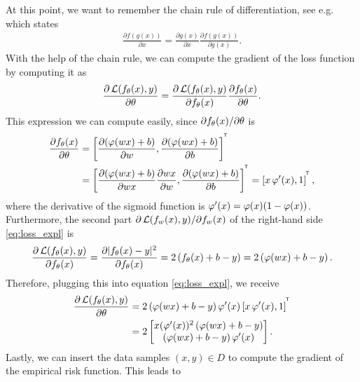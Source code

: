 \begin{example}
\begin{enumerate}
At this point, we want to remember the chain rule of differentiation, see e.g. \cite[Chapter19.6]{simmons1995calculus} which states
\begin{align}\label{eq:chain_rule}
\frac{\partial f(g(x))}{\partial x} = \frac{\partial g(x)}{\partial x} \frac{\partial f(g(x))}{\partial g(x)}.
\end{align}
With the help of the chain rule, we can compute the gradient of the loss function by computing it as
\begin{align}\label{eq:loss_expl}
\frac{\partial \operatorname{\mathcal{L}}(f_\theta(x), y)}{\partial \theta} = \frac{\partial \operatorname{\mathcal{L}}(f_\theta(x), y)}{\partial f_\theta(x)}\frac{\partial f_\theta(x)}{\partial \theta}.
\end{align}
This expression we can compute easily, since $\partial f_\theta(x)/\partial \theta$ is
\begin{align*}
\frac{\partial f_\theta(x)}{\partial \theta}
&= \left[\frac{\partial (\operatorname{\varphi}(wx) + b)}{\partial w}, \frac{\partial (\operatorname{\varphi}(wx) + b)}{\partial b} \right]^{^{\mkern-1.5mu\mathsf{T}}}\\
&= \left[\frac{\partial (\operatorname{\varphi}(wx) + b)}{\partial wx} \frac{\partial wx}{\partial w}, \frac{\partial (\operatorname{\varphi}(wx) + b)}{\partial b} \right]^{^{\mkern-1.5mu\mathsf{T}}} = \left[x\operatorname{\varphi}^{\prime}(x), 1 \right]^{^{\mkern-1.5mu\mathsf{T}}},
\end{align*}
where the derivative of the sigmoid function is $\operatorname{\varphi}^{\prime}(x) = \operatorname{\varphi}(x)(1 - \operatorname{\varphi}(x))$.\\
Furthermore, the second part $\partial \operatorname{\mathcal{L}}(f_w(x), y)/\partial f_w(x)$ of the right-hand side \eqref{eq:loss_expl} is
\begin{align*}
\frac{\partial \operatorname{\mathcal{L}}(f_\theta(x), y)}{\partial f_\theta(x)} = \frac{\partial |f_\theta(x) - y|^2}{\partial f_\theta(x)} = 2 \left(f_\theta(x) + b - y \right) = 2 \left(\operatorname{\varphi}(wx) + b - y \right).
\end{align*}
Therefore, plugging this into equation \eqref{eq:loss_expl}, we receive
\begin{align*}
\frac{\partial \operatorname{\mathcal{L}}(f_\theta(x), y)}{\partial \theta} &= 2 \left(\operatorname{\varphi}(wx) + b - y \right) \operatorname{\varphi}^{\prime}(x) \left[x\operatorname{\varphi}^{\prime}(x), 1 \right]^{^{\mkern-1.5mu\mathsf{T}}}\\
&= 2 \left[ \begin{matrix}
x(\operatorname{\varphi}^{\prime}(x))^2\left(\operatorname{\varphi}(wx) + b - y \right)\\
\left(\operatorname{\varphi}(wx) + b - y \right) \operatorname{\varphi}^{\prime}(x)
\end{matrix}
\right].
\end{align*}
Lastly, we can insert the data samples $(x, y)\in D$ to compute the gradient of the empirical risk function. This leads to
\begin{align*}

\end{align*}
\end{enumerate}
\end{example}

